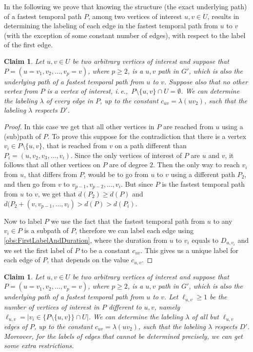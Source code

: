 \documentclass[11pt,a4paper]{article}
\newtheorem{claim}[theorem]{Claim}
\theoremstyle{remark}
\theoremstyle{definition}
\newcommand{\ie}{i.\,e.,\ }
\begin{document}
In the following we prove that knowing the structure (the exact underlying path) of a fastest temporal path $P$, among two vertices of interest $u,v \in U$,
results in determining the labeling of each edge in the fastest temporal path from $u$ to $v$ (with the exception of some constant number of edges), with respect to the label of the first edge.

\begin{claim}
    Let $u, v \in U$ be two arbitrary vertices of interest and suppose that $P = (u=v_1,v_2, \dots, v_p = v)$, where $p \geq 2$, 
    is a $u,v$ path in $G'$, which is also the underlying path of a fastest temporal path from $u$ to $v$.
    Suppose also that no other vertex from $P$ is a vertex of interest, \ie $P \setminus \{u,v\} \cap U = \emptyset$.
    We can determine the labeling $\lambda$ of every edge in $P$, up to the constant $c_{uv} = \lambda(uv_2)$,
    such that the labeling $\lambda$ respects $D'$.
\end{claim}

\begin{proof}
In this case we get that all other vertices in $P$ are reached from $u$ using a (sub)path of $P$.
To prove this suppose for the contradiction that there is a vertex $v_i \in P \setminus \{u,v\}$, that is reached from $v$ on a path different than $P_i = (u, v_2, v_3, \dots, v_i)$.
Since the only vertices of interest of $P$ are $u$ and $v$, it follows that all other vertices on $P$ are of degree $2$. 
Then the only way to reach $v_i$ from $u$, that differs from $P$, would be to go from $u$ to $v$ using a different path $P_2$,
and then go from $v$ to $v_{p-1}, v_{p-2}, \dots, v_i$.
But since $P$ is the fastest temporal path from $u$ to $v$, we get that $d(P_2) \geq d(P)$ and $d(P_2 + (v,v_{p-1}, \dots, v_i) > d(P) > d(P_i)$.

Now to label $P$ we use the fact that the fastest temporal path from $u$ to any $v_i \in P$ is a subpath of $P$, 
therefore we can label each edge using \cref{obs:FirstLabelAndDuration},
where the duration from $u$ to $v_i$ equals to $D_{u,v_i}$ and 
we set the first label of $P$ to be a constant $c_{uv}$.
This gives us a unique label for each edge of $P$, that depends on the value $c_{u,v}$.
\end{proof}

\begin{claim}
    Let $u, v \in U$ be two arbitrary vertices of interest and suppose that $P = (u=v_1, v_2, \dots, v_p = v)$, where $p \geq 2$, 
    is a $u,v$ path in $G'$, which is also the underlying path of a fastest temporal path from $u$ to $v$.
    Let $\ell_{u,v} \geq 1$ be the number of vertices of interest in $P$ different to $u,v$, namely $\ell_{u,v} = | v_i \in \{P \setminus \{u,v \} \} \cap U |$.
    We can determine the labeling $\lambda$ of all but $\ell_{u,v}$ edges of $P$, up to the constant $c_{uv} = \lambda(uv_2)$,
    such that the labeling $\lambda$ respects $D'$.
    Moreover, for the labels of edges that cannot be determined precisely, we can get some extra restrictions.
\end{claim}
\end{document}
